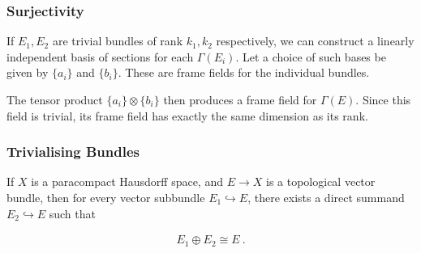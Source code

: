 \begin{frame}
    \frametitle{Surjectivity}


    If \(E_1, E_2\) are trivial bundles of rank \(k_1, k_2\) respectively, we
    can construct a linearly independent basis of sections for each
    \(\Gamma(E_i)\). Let a choice of such bases be given by \(\{a_i\}\) and
    \(\{b_i\}\). These are frame fields for the individual bundles. \\ \pause

    The tensor product \(\{a_i\} \otimes \{b_i\}\) then produces a frame field
    for \(\Gamma(E)\). Since this field is trivial, its frame field has exactly
    the same dimension as its rank.




\end{frame}

\begin{frame}
    \frametitle{Trivialising Bundles}

    \begin{theorem}
        If \(X\) is a paracompact Hausdorff space, and \(E \to X\) is a
        topological vector bundle, then for every vector subbundle \(E_1
        \hookrightarrow E\), there exists a direct summand \(E_2 \hookrightarrow
        E\) such that 

        \begin{gather*}
            E_1 \oplus E_2 \cong E~.
        \end{gather*}

    \end{theorem}


\end{frame}

